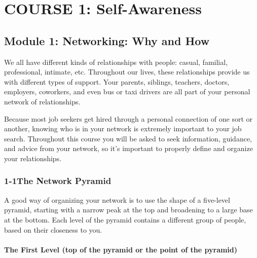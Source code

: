 \hypertarget{course1}{}\chapter*{COURSE 1: Self-Awareness}\label{course1}

\noindent\makebox[\textwidth]{\rule{\linewidth}{0.4pt}}
\localtableofcontents
\noindent\makebox[\textwidth]{\rule{\linewidth}{0.4pt}}
\pagebreak \section*{Module 1: Networking: Why and How} 
\noindent\makebox[\textwidth]{\rule{\linewidth}{0.4pt}} 
\localtableofcontents 
\noindent\makebox[\textwidth]{\rule{\linewidth}{0.4pt}} 


We all have different kinds of relationships with people: casual, familial, professional, intimate, etc. Throughout our lives, these relationships provide us with different types of support. Your parents, siblings, teachers, doctors, employers, coworkers, and even bus or taxi drivers are all part of your personal network of relationships.

Because most job seekers get hired through a personal connection of one sort or another, knowing who is in your network is extremely important to your job search. Throughout this course you will be asked to seek information, guidance, and advice from your network, so it's important to properly define and organize your relationships.

\pagebreak \subsection*{1-1\quad The Network Pyramid}
A good way of organizing your network is to use the shape of a five-level pyramid, starting with a narrow peak at the top and broadening to a large base at the bottom. Each level of the pyramid contains a different group of people, based on their closeness to you.

\subsubsection*{The First Level (top of the pyramid or the point of the pyramid)}

